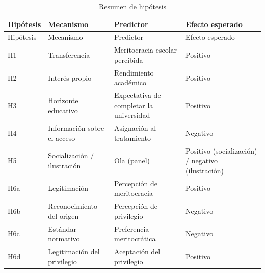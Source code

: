 \documentclass[
  spanish,
  a4paper,
  oneside]{scrbook}
\begin{document}
\begin{longtable}[]{@{}
  >{\raggedright\arraybackslash}p{}
  >{\raggedright\arraybackslash}p{}
  >{\raggedright\arraybackslash}p{}
  >{\raggedright\arraybackslash}p{}@{}}
\caption{Resumen de hipótesis}\label{tbl-hipotesis}\tabularnewline
\toprule\noalign{}
\begin{minipage}[b]{\linewidth}\raggedright
Hipótesis
\end{minipage} & \begin{minipage}[b]{\linewidth}\raggedright
Mecanismo
\end{minipage} & \begin{minipage}[b]{\linewidth}\raggedright
Predictor
\end{minipage} & \begin{minipage}[b]{\linewidth}\raggedright
Efecto esperado
\end{minipage} \\
\midrule\noalign{}
\endfirsthead
\toprule\noalign{}
\begin{minipage}[b]{\linewidth}\raggedright
Hipótesis
\end{minipage} & \begin{minipage}[b]{\linewidth}\raggedright
Mecanismo
\end{minipage} & \begin{minipage}[b]{\linewidth}\raggedright
Predictor
\end{minipage} & \begin{minipage}[b]{\linewidth}\raggedright
Efecto esperado
\end{minipage} \\
\midrule\noalign{}
\endhead
\bottomrule\noalign{}
\endlastfoot
H1 & Transferencia & Meritocracia escolar percibida & Positivo \\
H2 & Interés propio & Rendimiento académico & Positivo \\
H3 & Horizonte educativo & Expectativa de completar la universidad &
Positivo \\
H4 & Información sobre el acceso & Asignación al tratamiento &
Negativo \\
H5 & Socialización / ilustración & Ola (panel) & Positivo
(socialización) / negativo (ilustración) \\
H6a & Legitimación & Percepción de meritocracia & Positivo \\
H6b & Reconocimiento del origen & Percepción de privilegio & Negativo \\
H6c & Estándar normativo & Preferencia meritocrática & Negativo \\
H6d & Legitimación del privilegio & Aceptación del privilegio &
Positivo \\
\end{longtable}
\end{document}
